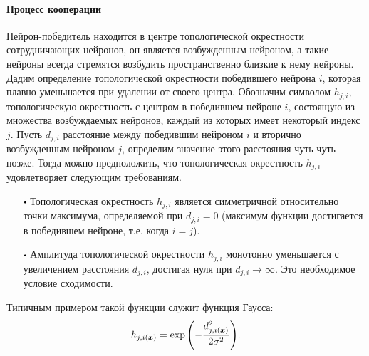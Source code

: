 \documentclass[a4paper,12pt]{report}
\begin{document}
\paragraph{Процесс кооперации}
Нейрон-победитель находится в центре топологической окрестности
сотрудничающих нейронов, он является возбужденным нейроном, а такие
нейроны всегда стремятся возбудить пространственно близкие к нему
нейроны. Дадим определение топологической окрестности победившего
нейрона $i$, которая плавно уменьшается при удалении от своего центра.
Обозначим символом $h_{j,i}$, топологическую окрестность с центром в
победившем нейроне $i$, состоящую из множества возбуждаемых нейронов,
каждый из которых имеет некоторый индекс $j$. Пусть $d_{j,i}$
расстояние между победившим нейроном $i$ и вторично возбужденным
нейроном $j$, определим значение этого расстояния чуть-чуть позже.
Тогда можно предположить, что топологическая окрестность
$h_{j,i}$ удовлетворяет следующим требованиям.
\begin{itemize}
    \item[$\bigcdot$] Топологическая окрестность $h_{j,i}$ является
        симметричной относительно точки максимума, определяемой при
        $d_{j,i} = 0$ (максимум функции достигается в победившем
        нейроне, т.е. когда $i = j$).
    \item[$\bigcdot$] Амплитуда топологической окрестности $h_{j,i}$
        монотонно уменьшается с увеличением расстояния $d_{j,i}$,
        достигая нуля при $d_{j,i} \to \infty$. Это необходимое
        условие сходимости.
\end{itemize}

Типичным примером такой функции служит функция Гаусса:
\begin{equation} \label{eq:Gauss Func}
    h_{j,i(\boldsymbol{x})}=\exp{\left(-\frac{d_{j,i(\boldsymbol{x})}^{2}}{2\sigma^2}\right)}.
\end{equation}
\end{document}
